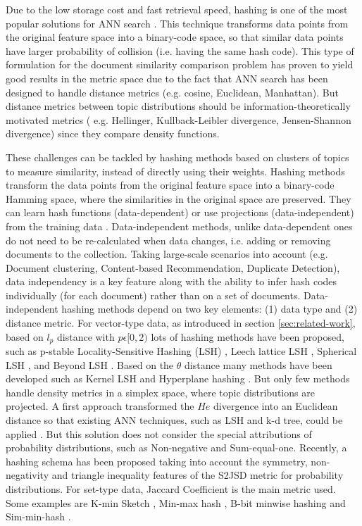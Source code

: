 Due to the low storage cost and fast retrieval speed, hashing is one of the most popular solutions for ANN search \citep{Zhen2016}. This technique transforms data points from the original feature space into a binary-code space, so that similar data points have larger probability of collision (i.e. having the same hash code). This type of formulation for the document similarity comparison problem has proven to yield good results in the metric space \citep{Krstovski2011} due to the fact that ANN search has been designed to handle distance metrics (e.g. cosine, Euclidean, Manhattan). But distance metrics between topic distributions should be information-theoretically motivated metrics ( e.g. Hellinger, Kullback-Leibler divergence, Jensen-Shannon divergence) since they compare density functions. 

These challenges can be tackled by hashing methods based on clusters of topics to measure similarity, instead of directly using their weights. Hashing methods transform the data points from the original feature space into a binary-code Hamming space, where the similarities in the original space are preserved. They can learn hash functions (data-dependent) or use projections (data-independent) from the training data \citep{Wang2016}. Data-independent methods, unlike data-dependent ones do not need to be re-calculated when data changes, i.e. adding or removing documents to the collection. Taking large-scale scenarios into account (e.g. Document clustering, Content-based Recommendation, Duplicate Detection), data independency is a key feature along with the ability to infer hash codes individually (for each document) rather than on a set of documents. Data-independent hashing methods depend on two key elements: (1) data type and (2) distance metric. For vector-type data, as introduced in section \ref{sec:related-work}, based on $l_p$ distance with $p \epsilon [0,2)$ lots of hashing methods have been proposed, such as p-stable Locality-Sensitive Hashing (LSH) \citep{Datar2004}, Leech lattice LSH \citep{Andoni2006}, Spherical LSH \citep{Terasawa2007}, and Beyond LSH \citep{Andoni2014}. Based on the $\theta$ distance many methods have been developed such as Kernel LSH \citep{Kulis2012} and Hyperplane hashing \cite{Vijayanarasimhan2014}. But only few methods handle density metrics in a simplex space, where topic distributions are projected. A first approach transformed the $He$ divergence into an Euclidean distance so that existing ANN techniques, such as LSH and k-d tree, could be applied \cite{Krstovski2013a}. But this solution does not consider the special attributions of probability distributions, such as Non-negative and Sum-equal-one. Recently, a hashing schema \citep{Mao2017} has been proposed taking into account the symmetry, non-negativity and triangle inequality features of the S2JSD metric for probability distributions. For set-type data, Jaccard Coefficient is the main metric used. Some examples are K-min Sketch \citep{Li2012}, Min-max hash \citep{Ji2013}, B-bit minwise hashing \citep{Li2010b} and Sim-min-hash \citep{Zhao2013}.

